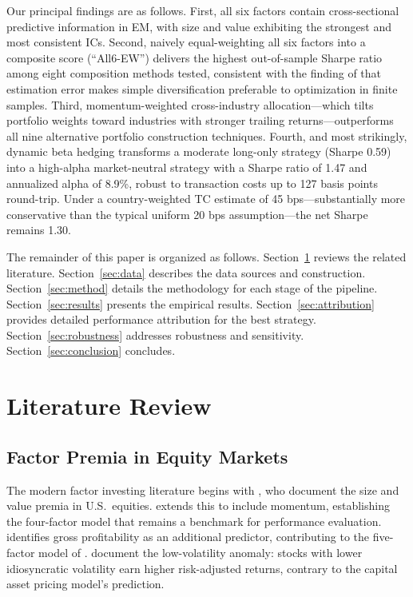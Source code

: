 \documentclass[12pt,a4paper]{article}
\begin{document}
Our principal findings are as follows. First, all six factors contain cross-sectional predictive information in EM, with size and value exhibiting the strongest and most consistent ICs. Second, naively equal-weighting all six factors into a composite score (``All6-EW'') delivers the highest out-of-sample Sharpe ratio among eight composition methods tested, consistent with the finding of \citet{demiguel2009} that estimation error makes simple diversification preferable to optimization in finite samples. Third, momentum-weighted cross-industry allocation---which tilts portfolio weights toward industries with stronger trailing returns---outperforms all nine alternative portfolio construction techniques. Fourth, and most strikingly, dynamic beta hedging transforms a moderate long-only strategy (Sharpe 0.59) into a high-alpha market-neutral strategy with a Sharpe ratio of 1.47 and annualized alpha of 8.9\%, robust to transaction costs up to 127 basis points round-trip. Under a country-weighted TC estimate of 45 bps---substantially more conservative than the typical uniform 20 bps assumption---the net Sharpe remains 1.30.

The remainder of this paper is organized as follows. Section~\ref{sec:lit} reviews the related literature. Section~\ref{sec:data} describes the data sources and construction. Section~\ref{sec:method} details the methodology for each stage of the pipeline. Section~\ref{sec:results} presents the empirical results. Section~\ref{sec:attribution} provides detailed performance attribution for the best strategy. Section~\ref{sec:robustness} addresses robustness and sensitivity. Section~\ref{sec:conclusion} concludes.


\section{Literature Review}
\label{sec:lit}

\subsection{Factor Premia in Equity Markets}

The modern factor investing literature begins with \citet{famafrench1993}, who document the size and value premia in U.S.\ equities. \citet{carhart1997} extends this to include momentum, establishing the four-factor model that remains a benchmark for performance evaluation. \citet{novymarx2013} identifies gross profitability as an additional predictor, contributing to the five-factor model of \citet{famafrench2015}. \citet{ang2006} document the low-volatility anomaly: stocks with lower idiosyncratic volatility earn higher risk-adjusted returns, contrary to the capital asset pricing model's prediction.
\end{document}
